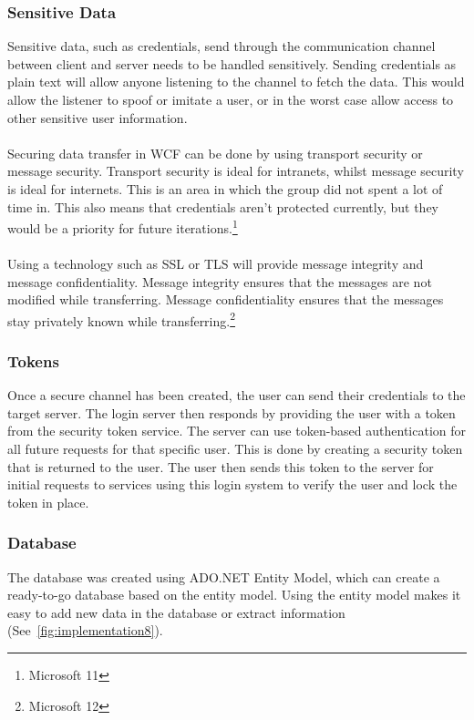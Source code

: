 \subsubsection {Sensitive Data}
Sensitive data, such as credentials, send through the communication
 channel between client and server needs to be handled sensitively.
  Sending credentials as plain text will allow anyone listening to
  the channel to fetch the data. This would allow the listener to
  spoof or imitate a user, or in the worst case allow access to
   other sensitive user information.
\\\\
Securing data transfer in WCF can be done by using transport
security or message security. Transport security is ideal for
 intranets, whilst message security is ideal for internets.
  This is an area in which the group did not spent a lot of time in.
   This also means that credentials aren’t protected currently,
    but they would be a priority for future iterations.\footnote{Microsoft 11}
\\\\
Using a technology such as SSL or TLS will provide message integrity
 and message confidentiality. Message integrity ensures that the messages
 are not modified while transferring. Message confidentiality ensures
  that the messages stay privately known while
  transferring.\footnote{Microsoft 12}

\subsubsection {Tokens}
Once a secure channel has been created, the user can send their
credentials to the target server. The login server then responds
 by providing the user with a token from the security token service.
 The server can use token-based authentication for all future requests
 for that specific user. This is done by creating a security token that
 is returned to the user. The user then sends this token to the server for
  initial requests to services using this login system to verify the user
   and lock the token in place.

\subsubsection {Database}
The database was created using ADO.NET Entity Model, which can create a
ready-to-go database based on the entity model. Using the entity model
 makes it easy to add new data in the database or extract
  information (See~\ref{fig:implementation8}).

